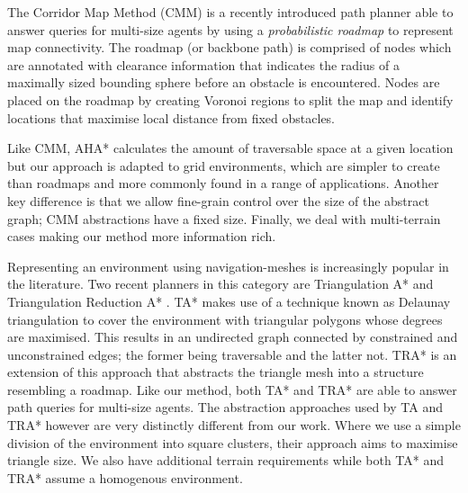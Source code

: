 \indent The Corridor Map Method (CMM) \cite{geraerts07} is a recently introduced path planner able to answer queries for multi-size agents by using a \emph{probabilistic roadmap} to represent map connectivity. 
The roadmap (or backbone path) is comprised of nodes which are annotated with clearance information that indicates the radius of a maximally sized bounding sphere before an obstacle is encountered. 
Nodes are placed on the roadmap by creating Voronoi regions to split the map and identify locations that maximise local distance from fixed obstacles. 
\par \indent
Like CMM, AHA* calculates the amount of traversable space at a given location but our approach is adapted to grid environments, which are simpler to create than roadmaps and more commonly found in a range of applications. 
Another key difference is that we allow fine-grain control over the size of the abstract graph; CMM abstractions have a fixed size.
Finally, we deal with multi-terrain cases making our method more information rich. 
\par \indent 
Representing an environment using navigation-meshes is increasingly popular in the literature. 
Two recent planners in this category are Triangulation A* and Triangulation Reduction A* \cite{demyen07}. 
TA* makes use of a technique known as Delaunay triangulation to cover the environment with triangular polygons whose degrees are maximised. 
This results in an undirected graph connected by constrained and unconstrained edges; the former being traversable and the latter not. 
TRA* is an extension of this approach that abstracts the triangle mesh into a structure resembling a roadmap. 
Like our method, both TA* and TRA* are able to answer path queries for multi-size agents. 
The abstraction approaches used by TA and TRA* however are very distinctly different from our work. 
Where we use a simple division of the environment into square clusters, their approach aims to maximise triangle size. 
We also have additional terrain requirements while both TA* and TRA* assume a homogenous environment.

